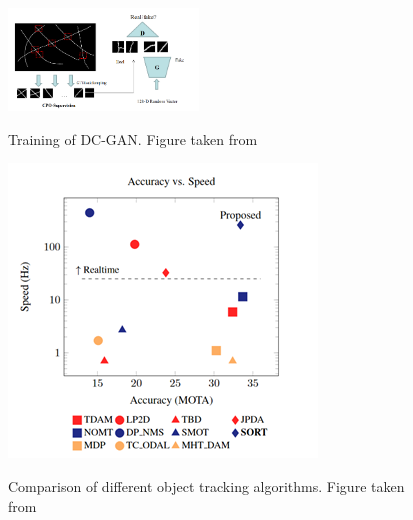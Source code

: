 \documentclass[11pt]{article}		%
\newlength{\imageheight}	 %
\begin{document}
         	\begin{figure}[h]
				\centering
				\begin{multicols}{2}
					\includegraphics[width=0.45\textwidth]{Generative_CPO_CrackGan}
					\caption{Training of DC-GAN. Figure taken from \cite{CrackGAN1}}
					\label{Generative_CPO_CrackGan}
					\columnbreak
    				\includegraphics[height=\imageheight] {comparison_object_tracking}
    				\caption{Comparison of different object tracking algorithms. Figure taken from \cite{object_tracking}}
    				\label{object_tracking_comp}
				\end{multicols}
			\end{figure}
			
\end{document}
